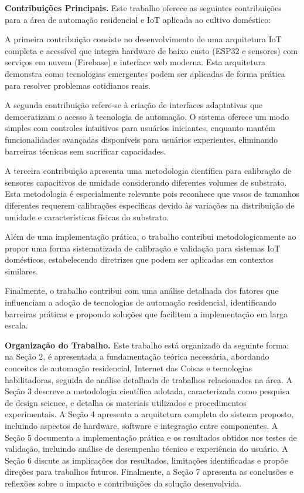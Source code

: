 \documentclass[twoside,english,brazilian]{UNISINOSmonografia}
\begin{document}
\noindent\textbf{Contribuições Principais.} Este trabalho oferece as seguintes contribuições para a área de automação residencial e IoT aplicada ao cultivo doméstico:

A primeira contribuição consiste no desenvolvimento de uma arquitetura IoT completa e acessível que integra hardware de baixo custo (ESP32 e sensores) com serviços em nuvem (Firebase) e interface web moderna. Esta arquitetura demonstra como tecnologias emergentes podem ser aplicadas de forma prática para resolver problemas cotidianos reais.

A segunda contribuição refere-se à criação de interfaces adaptativas que democratizam o acesso à tecnologia de automação. O sistema oferece um modo simples com controles intuitivos para usuários iniciantes, enquanto mantém funcionalidades avançadas disponíveis para usuários experientes, eliminando barreiras técnicas sem sacrificar capacidades.

A terceira contribuição apresenta uma metodologia científica para calibração de sensores capacitivos de umidade considerando diferentes volumes de substrato. Esta metodologia é especialmente relevante pois reconhece que vasos de tamanhos diferentes requerem calibrações específicas devido às variações na distribuição de umidade e características físicas do substrato.

Além de uma implementação prática, o trabalho contribui metodologicamente ao propor uma forma sistematizada de calibração e validação para sistemas IoT domésticos, estabelecendo diretrizes que podem ser aplicadas em contextos similares. 

Finalmente, o trabalho contribui com uma análise detalhada dos fatores que influenciam a adoção de tecnologias de automação residencial, identificando barreiras práticas e propondo soluções que facilitem a implementação em larga escala.

\noindent\textbf{Organização do Trabalho.} Este trabalho está organizado da seguinte forma: na Seção 2, é apresentada a fundamentação teórica necessária, abordando conceitos de automação residencial, Internet das Coisas e tecnologias habilitadoras, seguida de análise detalhada de trabalhos relacionados na área. A Seção 3 descreve a metodologia científica adotada, caracterizada como pesquisa de design science, e detalha os materiais utilizados e procedimentos experimentais. A Seção 4 apresenta a arquitetura completa do sistema proposto, incluindo aspectos de hardware, software e integração entre componentes. A Seção 5 documenta a implementação prática e os resultados obtidos nos testes de validação, incluindo análise de desempenho técnico e experiência do usuário. A Seção 6 discute as implicações dos resultados, limitações identificadas e propõe direções para trabalhos futuros. Finalmente, a Seção 7 apresenta as conclusões e reflexões sobre o impacto e contribuições da solução desenvolvida.
\end{document}
